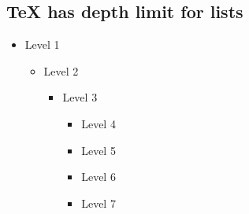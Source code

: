 
\subsection*{TeX has depth limit for lists}

\begin{itemize}
\item Level 1
  \begin{itemize}
  \item Level 2
    \begin{itemize}
    \item Level 3
      \begin{itemize}
      \item Level 4
      \item Level 5
      \item Level 6
      \item Level 7
      \end{itemize}
    \end{itemize}
  \end{itemize}
\end{itemize}

